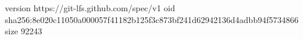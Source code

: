 version https://git-lfs.github.com/spec/v1
oid sha256:8e020c11050a000057f41182b125f3c873bf241d62942136d4adbb94f5734866
size 92243
